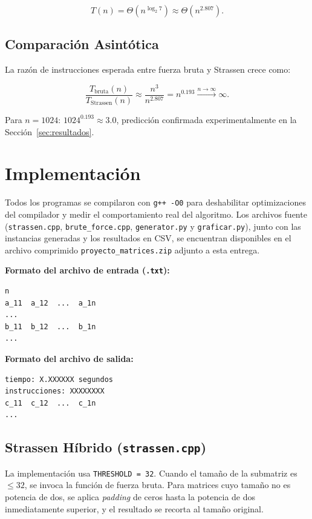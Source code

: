 \documentclass[12pt,a4paper]{article}
\begin{document}
\begin{equation}
    \boxed{T(n) = \Theta(n^{\log_2 7}) \approx \Theta(n^{2{.}807})}.
\end{equation}

\subsection{Comparaci\'on Asint\'otica}

La raz\'on de instrucciones esperada entre fuerza bruta y Strassen crece como:

\[
\frac{T_{\text{bruta}}(n)}{T_{\text{Strassen}}(n)}
\approx \frac{n^3}{n^{2{.}807}} = n^{0{.}193}
\xrightarrow{n \to \infty} \infty.
\]

Para $n = 1024$: $1024^{0.193} \approx 3{.}0$, predicci\'on confirmada
experimentalmente en la Secci\'on~\ref{sec:resultados}.

\section{Implementaci\'on}
\label{sec:implementacion}

Todos los programas se compilaron con \texttt{g++ -O0} para deshabilitar
optimizaciones del compilador y medir el comportamiento real del algoritmo.
Los archivos fuente (\texttt{strassen.cpp}, \texttt{brute\_force.cpp},
\texttt{generator.py} y \texttt{graficar.py}), junto con las instancias
generadas y los resultados en CSV, se encuentran disponibles en el archivo
comprimido \texttt{proyecto\_matrices.zip} adjunto a esta entrega.

\noindent\textbf{Formato del archivo de entrada (\texttt{.txt}):}
\begin{verbatim}
n
a_11  a_12  ...  a_1n
...
b_11  b_12  ...  b_1n
...
\end{verbatim}

\noindent\textbf{Formato del archivo de salida:}
\begin{verbatim}
tiempo: X.XXXXXX segundos
instrucciones: XXXXXXXX
c_11  c_12  ...  c_1n
...
\end{verbatim}

\subsection{Strassen H\'ibrido (\texttt{strassen.cpp})}

La implementaci\'on usa \texttt{THRESHOLD = 32}. Cuando el tama\~no de la
submatriz es $\le 32$, se invoca la funci\'on de fuerza bruta. Para matrices
cuyo tama\~no no es potencia de dos, se aplica \emph{padding} de ceros hasta
la potencia de dos inmediatamente superior, y el resultado se recorta al
tama\~no original.
\end{document}
